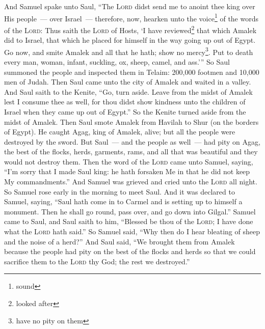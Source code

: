 
\begin{inparaenum}
     And Samuel spake unto Saul, ``The \textsc{Lord} didst send me to anoint thee king over His people~--- over Israel~--- therefore, now, hearken unto the voice\footnote{sound} of the words of the \textsc{Lord}:%
     Thus saith the \textsc{Lord} of Hosts, `I have reviewed\footnote{looked after} that which Amalek did to Israel, that which he placed for himself in the way going up out of Egypt.%
     Go now, and smite Amalek and all that he hath; show no mercy\footnote{have no pity on them}. Put to death every man, woman, infant, suckling, ox, sheep, camel, and ass.'''%
     So Saul summoned the people and inspected them in Telaim: 200,000 footmen and 10,000 men of Judah.%
     Then Saul came unto the city of Amalek and waited in a valley.%
     And Saul saith to the Kenite, ``Go, turn aside. Leave from the midst of Amalek lest I consume thee as well, for thou didst show kindness unto the children of Israel when they came up out of Egypt.'' So the Kenite turned aside from the midst of Amalek.%
     Then Saul smote Amalek from Havilah to Shur (on the borders of Egypt).%
     He caught Agag, king of Amalek, alive; but all the people were destroyed by the sword.%
     But Saul~--- and the people as well~--- had pity on Agag, the best of the flocks, herds, garments, rams, and all that was beautiful and they would not destroy them.%
     Then the word of the \textsc{Lord} came unto Samuel, saying,%
     ``I'm sorry that I made Saul king: he hath forsaken Me in that he did not keep My commandments.'' And Samuel was grieved and cried unto the \textsc{Lord} all night.%
     So Samuel rose early in the morning to meet Saul. And it was declared to Samuel, saying, ``Saul hath come in to Carmel and is setting up to himself a monument. Then he shall go round, pass over, and go down into Gilgal.''%
     Samuel came to Saul, and Saul saith to him, ``Blessed be thou of the \textsc{Lord}; I have done what the \textsc{Lord} hath said.''%
     So Samuel said, ``Why then do I hear bleating of sheep and the noise of a herd?''%
     And Saul said, ``We brought them from Amalek because the people had pity on the best of the flocks and herds so that we could sacrifice them to the \textsc{Lord} thy God; the rest we destroyed.''%

\end{inparaenum}
